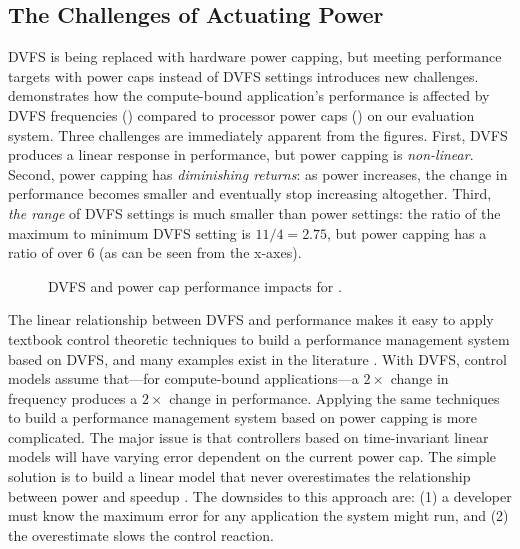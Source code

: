 \subsection{The Challenges of Actuating Power}
\label{sec:copper-motivation-power}

DVFS is being replaced with hardware power capping, but meeting performance targets with power caps instead of DVFS settings introduces new challenges.
 demonstrates how the compute-bound  application's performance is affected by DVFS frequencies () compared to processor power caps () on our evaluation system.
Three challenges are immediately apparent from the figures.
First, DVFS produces a linear response in performance, but power capping is \emph{non-linear}.
Second, power capping has \emph{diminishing returns}: as power increases, the change in performance becomes smaller and eventually stop increasing altogether.
Third, \emph{the range} of DVFS settings is much smaller than power settings: the ratio of the maximum to minimum DVFS setting is $11/4=2.75$, but power capping has a ratio of over 6 (as can be seen from the x-axes).

\begin{figure}[t]
  \centering
  \subfloat[DVFS.]%
  {%
  \label{fig:copper-tradeoffs-vips-dvfs}}
  \hspace*{0.5cm}
  \caption{DVFS and power cap performance impacts for .}
  \label{fig:copper-tradeoffs-vips}
\end{figure}

The linear relationship between DVFS and performance makes it easy to apply textbook control theoretic techniques to build a performance management system based on DVFS, and many examples exist in the literature \cite{ICSE2014,SWiFT,KaramanolisEtAl-2005a,lefurgy2008power,josep-isca2016,GRAPE,ControlWare}.
With DVFS, control models assume that---for compute-bound applications---a $2\times$ change in frequency produces a $2\times$ change in performance.
Applying the same techniques to build a performance management system based on power capping is more complicated.
The major issue is that controllers based on time-invariant linear models will have varying error dependent on the current power cap.
The simple solution is to build a linear model that never overestimates the relationship between power and speedup \cite{ICSE2014}.
The downsides to this approach are: (1) a developer must know the maximum error for any application the system might run, and (2) the overestimate slows the control reaction.

